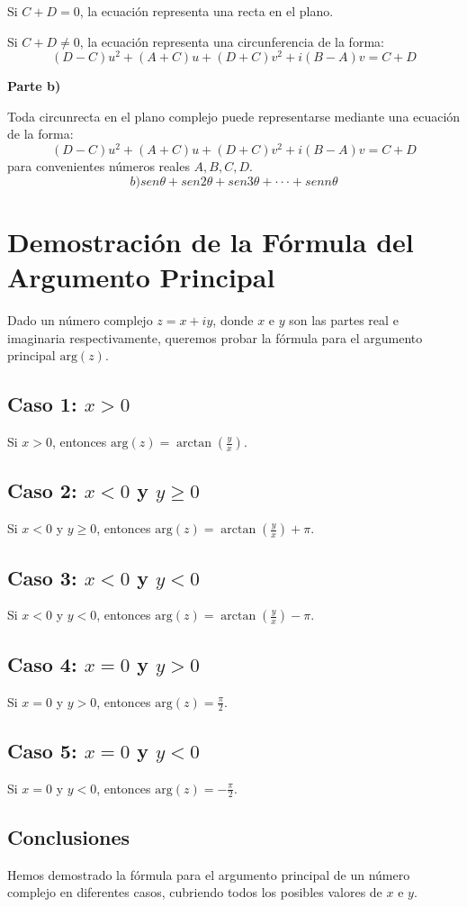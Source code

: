 \documentclass{article}
\begin{document}
Si \( C + D = 0 \), la ecuación representa una recta en el plano.

Si \( C + D \neq 0 \), la ecuación representa una circunferencia de la forma:
\[ (D - C) u^2 + (A + C) u + (D + C) v^2 + i(B - A) v = C + D \]

\textbf{Parte b)}

Toda circunrecta en el plano complejo puede representarse mediante una ecuación de la forma:
\[ (D - C) u^2 + (A + C) u + (D + C) v^2 + i(B - A) v = C + D \]
para convenientes números reales \( A, B, C, D \).
\newpage
\[
b) sen θ + sen 2θ + sen 3θ + · · · + sen nθ
\]
\section*{Demostración de la Fórmula del Argumento Principal}

Dado un número complejo \( z = x + iy \), donde \( x \) e \( y \) son las partes real e imaginaria respectivamente, queremos probar la fórmula para el argumento principal \( \text{arg}(z) \).

\subsection*{Caso 1: \( x > 0 \)}
Si \( x > 0 \), entonces \( \text{arg}(z) = \arctan\left(\frac{y}{x}\right) \).

\subsection*{Caso 2: \( x < 0 \) y \( y \geq 0 \)}
Si \( x < 0 \) y \( y \geq 0 \), entonces \( \text{arg}(z) = \arctan\left(\frac{y}{x}\right) + \pi \).

\subsection*{Caso 3: \( x < 0 \) y \( y < 0 \)}
Si \( x < 0 \) y \( y < 0 \), entonces \( \text{arg}(z) = \arctan\left(\frac{y}{x}\right) - \pi \).

\subsection*{Caso 4: \( x = 0 \) y \( y > 0 \)}
Si \( x = 0 \) y \( y > 0 \), entonces \( \text{arg}(z) = \frac{\pi}{2} \).

\subsection*{Caso 5: \( x = 0 \) y \( y < 0 \)}
Si \( x = 0 \) y \( y < 0 \), entonces \( \text{arg}(z) = -\frac{\pi}{2} \).

\subsection*{Conclusiones}
Hemos demostrado la fórmula para el argumento principal de un número complejo en diferentes casos, cubriendo todos los posibles valores de \( x \) e \( y \).
\end{document}
